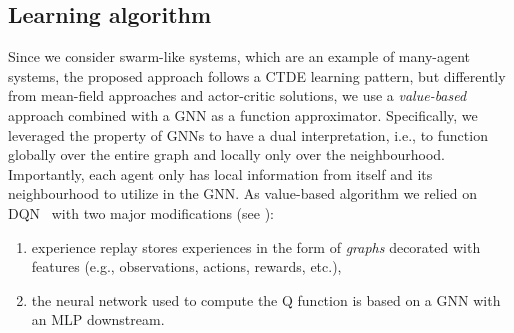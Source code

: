 \subsection{Learning algorithm}
Since we consider swarm-like systems, which are an example of many-agent systems, 
 the proposed approach follows a \ac{CTDE} learning pattern,
 but differently from mean-field approaches and actor-critic solutions,
 we use a \emph{value-based} approach combined with a \ac{GNN} as a function approximator.
%
%
Specifically, we leveraged the property of \ac{GNN}s to have a dual interpretation, 
i.e., to function globally over the entire graph and locally only over the neighbourhood. 
Importantly, each agent only has local information from itself and its neighbourhood to utilize in the \ac{GNN}.
%
As value-based algorithm we relied on \ac{DQN}~\cite{mnih2015playing} %
with two major modifications (see ): 
\begin{enumerate}
  \item experience replay stores experiences in the form of \emph{graphs} decorated with features (e.g., observations, actions, rewards, etc.),
  \item the neural network used to compute the Q function is based on a \ac{GNN} with an \ac{MLP} downstream.
\end{enumerate}
